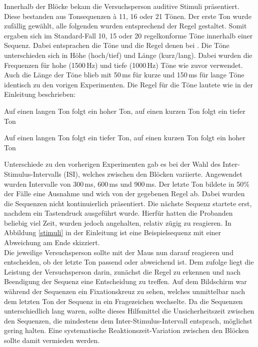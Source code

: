 \documentclass[doc,a4paper,12pt]{apa6}
\begin{document}
Innerhalb der Blöcke bekam die Versuchsperson auditive Stimuli präsentiert. Diese bestanden aus Tonsequenzen à 11, 16 oder 21 Tönen. Der erste Ton wurde zufällig gewählt, alle folgenden wurden entsprechend der Regel gestaltet. Somit ergaben sich im Standard-Fall 10, 15 oder 20 regelkonforme Töne innerhalb einer Sequenz. Dabei entsprachen die Töne und die Regel denen bei \textcite{paavilainen2007preattentive}. Die Töne unterschieden sich in Höhe (hoch/tief) und Länge (kurz/lang). Dabei wurden die Frequenzen für hohe (1500\,Hz) und tiefe (1000\,Hz) Töne wie zuvor verwendet. Auch die Länge der Töne blieb mit 50\,ms für kurze und 150\,ms für lange Töne identisch zu den vorigen Experimenten. Die Regel für die Töne lautete wie in der Einleitung beschrieben:

\begin{compactitem}
  \item Auf einen langen Ton folgt ein hoher Ton, auf einen kurzen Ton folgt ein tiefer
Ton
  \item Auf einen langen Ton folgt ein tiefer Ton, auf einen kurzen Ton folgt ein hoher
Ton
\end{compactitem}

Unterschiede zu den vorherigen Experimenten gab es bei der Wahl des Inter-Stimulus-Intervalls (ISI), welches zwischen den Blöcken variierte. Angewendet wurden Intervalle von 300\,ms, 600\,ms und 900\,ms. Der letzte Ton bildete in 50\% der Fälle eine Ausnahme und wich von der gegebenen Regel ab. Dabei wurden die Sequenzen nicht kontinuierlich präsentiert. Die nächste Sequenz startete erst, nachdem ein Tastendruck ausgeführt wurde. Hierfür hatten die Probanden beliebig viel Zeit, wurden jedoch angehalten, relativ zügig zu reagieren. In Abbildung \ref{stimuli} in der Einleitung ist eine Beispielsequenz mit einer Abweichung am Ende skizziert.\\
Die jeweilige Versuchsperson sollte mit der Maus nun darauf reagieren und entscheiden, ob der letzte Ton passend oder abweichend ist. Dem zufolge liegt die Leistung der Versuchsperson darin, zunächst die Regel zu erkennen und nach Beendigung der Sequenz eine Entscheidung zu treffen. Auf dem Bildschirm war während der Sequenzen ein Fixationskreuz zu sehen, welches unmittelbar nach dem letzten Ton der Sequenz in ein Fragezeichen wechselte. Da die Sequenzen unterschiedlich lang waren, sollte dieses Hilfsmittel die Unsicherheitszeit zwischen den Sequenzen, die mindestens dem Inter-Stimulus-Intervall entsprach, möglichst gering halten. Eine systematische Reaktionszeit-Variation zwischen den Blöcken sollte damit vermieden werden.
\end{document}
